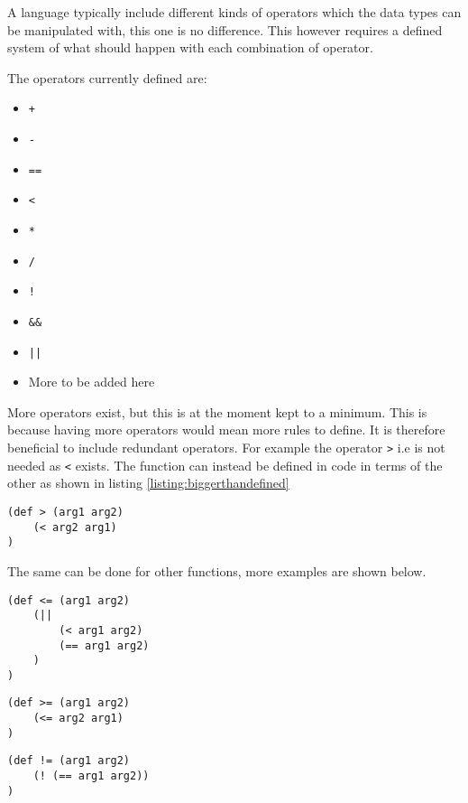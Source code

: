 A language typically include different kinds of operators which the data types can be manipulated with, this one is no difference.
This however requires a defined system of what should happen with each combination of operator. 

The operators currently defined are:
\begin{itemize}
	\item \texttt{+}
	\item \texttt{-}
	\item \texttt{==}
	\item \texttt{<}
	\item \texttt{*}
	\item \texttt{/}
	\item \texttt{!}
	\item \texttt{\&\&}
	\item \texttt{||}
	\item More to be added here
\end{itemize}

More operators exist, but this is at the moment kept to a minimum. 
This is because having more operators would mean more rules to define. 
It is therefore beneficial to include redundant operators. 
For example the operator \texttt{>} i.e is not needed as \texttt{<} exists.
The function can instead be defined in code in terms of the other as shown in listing \ref{listing:biggerthandefined}




\begin{lstlisting}[caption=Bigger than function defined in terms of less than,
label=listing:biggerthandefined]
(def > (arg1 arg2)
	(< arg2 arg1)
)
\end{lstlisting}

The same can be done for other functions, more examples are shown below.

\begin{lstlisting}[caption=Less than or equal to defined with the OR operator]
(def <= (arg1 arg2)
	(|| 
		(< arg1 arg2)
		(== arg1 arg2)
	)
)
\end{lstlisting}

\begin{lstlisting}[caption=More than or equal to defined with less than or equal to]
(def >= (arg1 arg2)
	(<= arg2 arg1) 
)
\end{lstlisting}

\begin{lstlisting}[caption=Definition for is not equal with the invert operator]
(def != (arg1 arg2)
	(! (== arg1 arg2))
)
\end{lstlisting}


